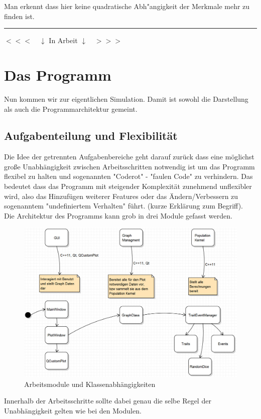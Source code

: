 \documentclass[11pt, a4paper, german]{article}
\begin{document}
	Man erkennt dass hier keine quadratische Abh"angigkeit der Merkmale mehr zu finden ist.
	
	
\clearpage	
	\noindent\rule{\textwidth}{2pt}
	\begin{center}
		$ <<< \quad \downarrow $ In Arbeit $ \downarrow \quad >>> $
	\end{center}

\section{Das Programm}
Nun kommen wir zur eigentlichen Simulation. Damit ist sowohl die Darstellung als auch die Programmarchitektur gemeint. 
	\subsection{Aufgabenteilung und Flexibilität}
	Die Idee der getrennten Aufgabenbereiche geht darauf zurück dass eine möglichst große Unabhängigkeit zwischen Arbeitsschritten notwendig ist um das Programm flexibel zu halten und sogenannten "{}Coderot"{} - "{}faulen Code"{} zu verhindern. Das bedeutet dass das Programm mit steigender Komplexität zunehmend unflexibler wird, also das Hinzufügen weiterer Features oder das Ändern/Verbessern zu sogenanntem "{}undefiniertem Verhalten"{} führt. (kurze Erklärung zum Begriff).\\
	Die Architektur des Programms kann grob in drei Module gefasst werden. 
	\begin{figure}[H]
		\centering
		\includegraphics[width=0.7\linewidth]{./Pictures/Bild_Module}
		\caption[Module]{Arbeitsmodule und Klassenabhängigkeiten}
		\label{Module und Klassen}
	\end{figure}
	Innerhalb der Arbeitsschritte sollte dabei genau die selbe Regel der Unabhängigkeit gelten wie bei den Modulen.
	
\end{document}
